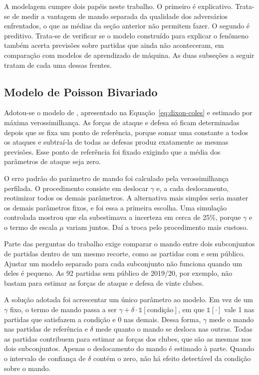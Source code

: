 A modelagem cumpre dois papéis neste trabalho. O primeiro é explicativo. Trata-se
de medir a vantagem de mando separada da qualidade dos adversários enfrentados,
o que as médias da seção anterior não permitem fazer. O segundo é preditivo.
Trata-se de verificar se o modelo construído para explicar o fenômeno também
acerta previsões sobre partidas que ainda não aconteceram, em comparação com
modelos de aprendizado de máquina. As duas subseções a seguir tratam de cada uma
dessas frentes.

\subsection{Modelo de Poisson Bivariado}\label{sec:met-dixon-coles}

Adotou-se o modelo de , apresentado na
Equação~\ref{eq:dixon-coles} e estimado por máxima verossimilhança. As forças de
ataque e defesa só ficam determinadas depois que se fixa um ponto de referência,
porque somar uma constante a todos os ataques e subtraí-la de todas as defesas
produz exatamente as mesmas previsões. Esse ponto de referência foi fixado
exigindo que a média dos parâmetros de ataque seja zero.

O erro padrão do parâmetro de mando foi calculado pela verossimilhança
perfilada. O procedimento consiste em deslocar $\gamma$ e, a cada deslocamento,
reotimizar todos os demais parâmetros. A alternativa mais simples seria manter
os demais parâmetros fixos, e foi essa a primeira escolha. Uma simulação
controlada mostrou que ela subestimava a incerteza em cerca de 25\%, porque
$\gamma$ e o termo de escala $\mu$ variam juntos. Daí a troca pelo procedimento
mais custoso.

Parte das perguntas do trabalho exige comparar o mando entre dois subconjuntos
de partidas dentro de um mesmo recorte, como as partidas com e sem público.
Ajustar um modelo separado para cada subconjunto não funciona quando um deles é
pequeno. As 92 partidas sem público de 2019/20, por exemplo, não bastam para
estimar as forças de ataque e defesa de vinte clubes.

A solução adotada foi acrescentar um único parâmetro ao modelo. Em vez de um
$\gamma$ fixo, o termo de mando passa a ser
$\gamma + \delta \cdot \mathbb{1}[\text{condição}]$, em que
$\mathbb{1}[\cdot]$ vale 1 nas partidas que satisfazem a condição e 0 nas
demais. Dessa forma, $\gamma$ mede o mando nas partidas de referência e $\delta$
mede quanto o mando se desloca nas outras. Todas as partidas contribuem para
estimar as forças dos clubes, que são as mesmas nos dois subconjuntos. Apenas o
deslocamento do mando é estimado à parte. Quando o intervalo de confiança de
$\delta$ contém o zero, não há efeito detectável da condição sobre o mando.

